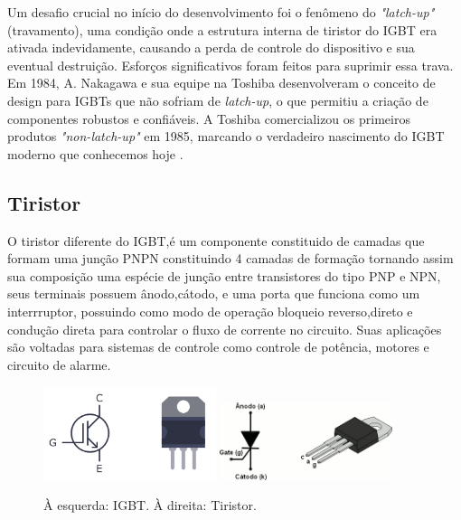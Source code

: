 \documentclass[12pt]{article}
\begin{document}
        Um desafio crucial no início do desenvolvimento foi o fenômeno do \textit{"latch-up"} (travamento), uma condição onde a estrutura interna de tiristor do IGBT era ativada indevidamente, causando a perda de controle do dispositivo e sua eventual destruição. Esforços significativos foram feitos para suprimir essa trava. Em 1984, A. Nakagawa e sua equipe na Toshiba desenvolveram o conceito de design para IGBTs que não sofriam de \textit{latch-up}, o que permitiu a criação de componentes robustos e confiáveis. A Toshiba comercializou os primeiros produtos \textit{"non-latch-up"} em 1985, marcando o verdadeiro nascimento do IGBT moderno que conhecemos hoje \cite{wiki_igbt, onsemi_igbt}.


        \subsection{Tiristor}

        O tiristor diferente do IGBT,é um componente constituido de camadas que formam uma junção PNPN constituindo 4 camadas de formação tornando assim sua composição uma espécie de junção entre transistores do tipo PNP e NPN, seus terminais possuem ânodo,cátodo, e uma porta que funciona como um interrruptor, possuindo como modo de operação bloqueio reverso,direto e condução direta para controlar o fluxo de corrente no circuito. Suas aplicações são voltadas para sistemas de controle como controle de potência, motores e circuito de alarme.

        \begin{figure}[H]
            \centering
            \includegraphics[width=0.45\textwidth]{./images/IGBT.png}
            \includegraphics[width=0.45\textwidth]{./images/tiristor.png}
        \caption{À esquerda: IGBT. À direita: Tiristor.}
        \end{figure}
\end{document}
